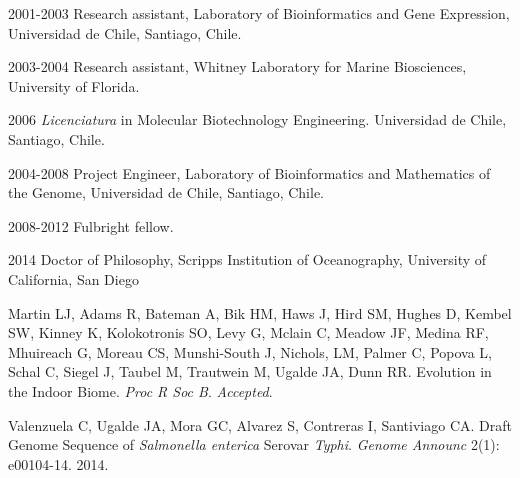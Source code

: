 \begin{frontmatter}
%
\tableofcontents
\listoffigures  %
\listoftables   %



%
%
\begin{acknowledgements} 

\end{acknowledgements}


%
%
\begin{vitapage}
\begin{vita}
  \item[2001-2003] Research assistant, Laboratory of Bioinformatics and Gene Expression, Universidad de Chile, Santiago, Chile.
  \item[2003-2004] Research assistant, Whitney Laboratory for Marine Biosciences, University of Florida.
  \item[2006] \emph{Licenciatura} in Molecular Biotechnology Engineering. Universidad de Chile, Santiago, Chile.
  \item[2004-2008] Project Engineer, Laboratory of Bioinformatics and Mathematics of the Genome, Universidad de Chile, Santiago, Chile.
  \item[2008-2012] Fulbright fellow.
  \item[2014] Doctor of Philosophy, Scripps Institution of Oceanography, University of California, San Diego 
\end{vita}


\begin{publications}

\item Martin LJ, Adams R, Bateman A, Bik HM, Haws J, Hird SM, Hughes D, Kembel SW, Kinney K, Kolokotronis SO, Levy G, Mclain C, Meadow JF, Medina RF, Mhuireach G, Moreau CS, Munshi-South J, Nichols, LM, Palmer C, Popova L, Schal C, Siegel J, Taubel M, Trautwein M, Ugalde JA, Dunn RR. Evolution in the Indoor Biome. \emph{Proc R Soc B}. \emph{Accepted}.

  \item Valenzuela C, Ugalde JA, Mora GC, Alvarez S, Contreras I, Santiviago CA. Draft Genome Sequence of \emph{Salmonella enterica} Serovar \emph{Typhi}.  \emph{Genome Announc} 2(1): e00104-14. 2014.


\end{publications}
\end{vitapage}
\end{frontmatter}

